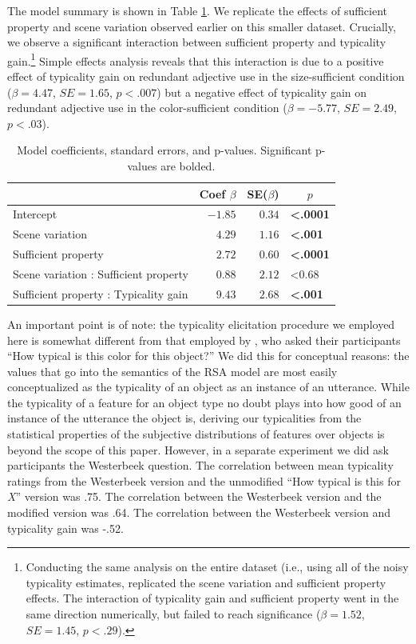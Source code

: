 \documentclass[11pt]{article}
\newcommand{\tableref}[1]{Table \ref{#1}}
\begin{document}
The model summary is shown in \tableref{tab:colortypicalityresults}. We replicate the effects of sufficient property and scene variation observed earlier on this smaller dataset. Crucially, we observe a significant interaction between sufficient property and typicality gain.\footnote{Conducting the same analysis on the entire dataset (i.e., using all of the noisy typicality estimates, replicated the scene variation and sufficient property effects. The interaction of typicality gain and sufficient property went in the same direction numerically, but failed to reach significance ($\beta = 1.52$, $SE = 1.45$, $p < .29$).} Simple effects analysis reveals that this interaction is due to a positive effect of typicality gain on redundant adjective use in the size-sufficient condition ($\beta = 4.47$, $SE = 1.65$, $p < .007$) but a negative effect of typicality gain on redundant adjective use in the color-sufficient condition  ($\beta = -5.77$, $SE = 2.49$, $p < .03$). 

\begin{table}[!tbp]
\caption{Model coefficients, standard errors, and p-values. Significant p-values are bolded.}
\begin{center}
\begin{tabular}{lrrl}
\toprule
\multicolumn{1}{l}{}&\multicolumn{1}{c}{Coef $\beta$}&\multicolumn{1}{c}{SE($\beta$)}&\multicolumn{1}{c}{$p$}\tabularnewline
\midrule
Intercept&$-1.85$&$0.34$&\textbf{\textless .0001}\tabularnewline
Scene variation&$ 4.29$&$1.16$&\textbf{\textless .001}\tabularnewline
Sufficient property&$ 2.72$&$0.60$&\textbf{\textless .0001}\tabularnewline
Scene variation : Sufficient property&$ 0.88$&$2.12$&\textless 0.68\tabularnewline
Sufficient property : Typicality gain&$ 9.43$&$2.68$&\textbf{\textless .001}\tabularnewline
\bottomrule
\end{tabular}\end{center}
\label{tab:colortypicalityresults}
\end{table}

 An important point is of note: the typicality elicitation procedure we employed here is somewhat different from that employed by , who asked their participants ``How typical is this color for this object?'' We did this for conceptual reasons: the values that go into the semantics of the RSA model are most easily conceptualized as the typicality of an object as an instance of an utterance. While the typicality of a feature for an object type no doubt plays into how good of an instance of the utterance the object is, deriving our typicalities from the  statistical properties of the subjective distributions of features over objects is beyond the scope of this paper. However, in a separate experiment we did ask participants the Westerbeek question. The correlation between mean typicality ratings from the Westerbeek version and the unmodified ``How typical is this for \emph{X}'' version was .75. The correlation between the Westerbeek version and the modified version was .64. The correlation between the Westerbeek version and typicality gain was -.52.
\end{document}

